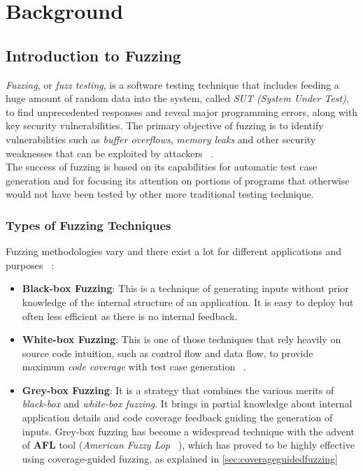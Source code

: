 \chapter{Background}
\label{chap:background}

\section{Introduction to Fuzzing}

\textit{Fuzzing}, or \textit{fuzz testing}, is a software testing technique that includes feeding a huge amount of random data into the system, called \textit{SUT (System Under Test)}, to find unprecedented responses and reveal major programming errors, along with key security vulnerabilities. The primary objective of fuzzing is to identify vulnerabilities such as \textit{buffer overflows}, \textit{memory leaks} and other security weaknesses that can be exploited by attackers ~\cite{fuzzingprogresschallenges}.
\\The success of fuzzing is based on its capabilities for automatic test case generation and for focusing its attention on portions of programs that otherwise would not have been tested by other more traditional testing technique.

\subsection{Types of Fuzzing Techniques}
Fuzzing methodologies vary and there exist a lot for different applications and purposes ~\cite{statefulfuzzingcristian}:

\begin{itemize}
    \item \textbf{Black-box Fuzzing}: This is a technique of generating inputs without prior knowledge of the internal structure of an application. It is easy to deploy but often less efficient as there is no internal feedback.
    
    \item \textbf{White-box Fuzzing}: This is one of those techniques that rely heavily on source code intuition, such as control flow and data flow, to provide maximum \textit{code coverage} with test case generation ~\cite{grammarfuzzingwhitebox}.
    
    \item \textbf{Grey-box Fuzzing}: It is a strategy that combines the various merits of \textit{black-box} and \textit{white-box fuzzing}. It brings in partial knowledge about internal application details and code coverage feedback guiding the generation of inputs. Grey-box fuzzing has become a widespread technique with the advent of \textbf{AFL} tool (\textit{American Fuzzy Lop} ~\cite{afl}), which has proved to be highly effective using coverage-guided fuzzing, as explained in \ref{sec:coverageguidedfuzzing}
\end{itemize}

